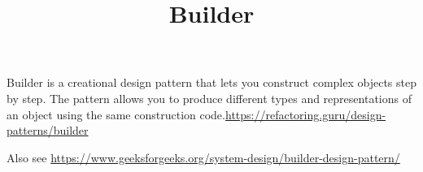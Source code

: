 \documentclass[a4paper]{article}
\title{Builder}
\date{}
\begin{document}
    \maketitle
    Builder is a creational design pattern that lets you construct complex objects step by step. The pattern allows you to produce different types and representations of an object using the same construction code.\url{https://refactoring.guru/design-patterns/builder}
    
    Also see
    \url{https://www.geeksforgeeks.org/system-design/builder-design-pattern/}
\end{document}
